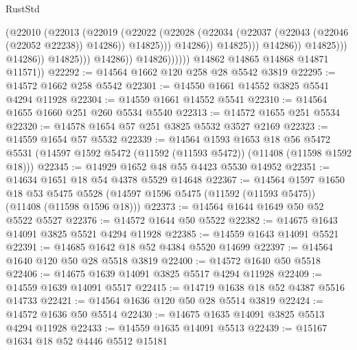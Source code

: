 \begin{lexlean}{RustStd}
\begin{coremodule}
                                                (@22010
                                                  (@22013
                                                    (@22019
                                                      (@22022
                                                        (@22028
                                                          (@22034
                                                            (@22037
                                                              (@22043
                                                                (@22046 (@22052 @22238))
                                                                @14286))
                                                            @14825)))
                                                      @14286))
                                                  @14825)))
                                            @14286))
                                        @14825)))
                                  @14286))
                              @14825)))
                        @14286))
                    @14826))))))
        @14862
        @14865
        @14868
        @14871
        @11571))
@22292 := @14564 @1662 @120 @258 @28 @5542 @3819
@22295 := @14572 @1662 @258 @5542
@22301 := @14550 @1661 @14552 @3825 @5541 @4294 @11928
@22304 := @14559 @1661 @14552 @5541
@22310 := @14564 @1655 @1660 @251 @260 @5534 @5540
@22313 := @14572 @1655 @251 @5534
@22320 := @14578 @1654 @57 @251 @3825 @5532 @3527 @2169
@22323 := @14559 @1654 @57 @5532
@22339 := @14564
    @1593
    @1653
    @18
    @56
    @5472
    @5531
    (@14597 @1592 @5472 (@11592 (@11593 @5472)) (@11408 (@11598 @1592 @18)))
@22345 := @14929 @1652 @48 @55 @4423 @5530 @14952
@22351 := @14634 @1651 @18 @54 @4378 @5529 @14648
@22367 := @14564
    @1597
    @1650
    @18
    @53
    @5475
    @5528
    (@14597 @1596 @5475 (@11592 (@11593 @5475)) (@11408 (@11598 @1596 @18)))
@22373 := @14564 @1644 @1649 @50 @52 @5522 @5527
@22376 := @14572 @1644 @50 @5522
@22382 := @14675 @1643 @14091 @3825 @5521 @4294 @11928
@22385 := @14559 @1643 @14091 @5521
@22391 := @14685 @1642 @18 @52 @4384 @5520 @14699
@22397 := @14564 @1640 @120 @50 @28 @5518 @3819
@22400 := @14572 @1640 @50 @5518
@22406 := @14675 @1639 @14091 @3825 @5517 @4294 @11928
@22409 := @14559 @1639 @14091 @5517
@22415 := @14719 @1638 @18 @52 @4387 @5516 @14733
@22421 := @14564 @1636 @120 @50 @28 @5514 @3819
@22424 := @14572 @1636 @50 @5514
@22430 := @14675 @1635 @14091 @3825 @5513 @4294 @11928
@22433 := @14559 @1635 @14091 @5513
@22439 := @15167 @1634 @18 @52 @4446 @5512 @15181

\end{coremodule}
\end{lexlean}
